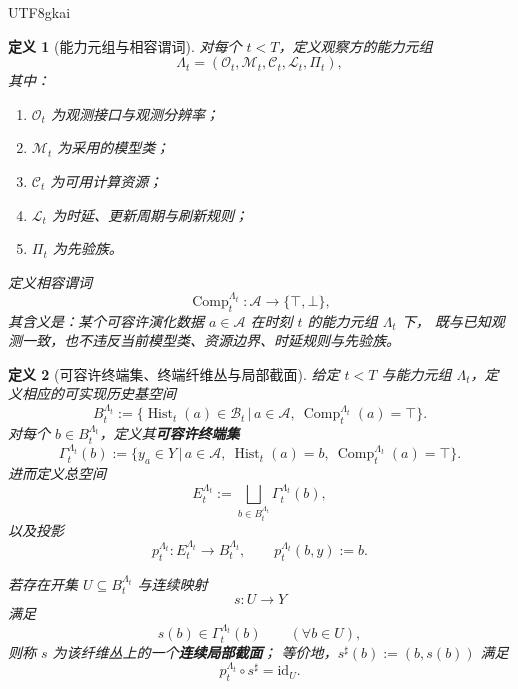 \documentclass[12pt]{article}
\newtheorem{definition}{定义}[section]
\newcommand{\Hist}{\operatorname{Hist}}
\newcommand{\Comp}{\operatorname{Comp}}
\newcommand{\id}{\mathrm{id}}
\begin{document}
\begin{CJK*}{UTF8}{gkai}
\begin{definition}[能力元组与相容谓词]
\label{def:tex1-capability}
对每个 $t<T$，定义观察方的能力元组
\[
  \Lambda_t=(\mathcal O_t,\mathcal M_t,\mathcal C_t,\mathcal L_t,\Pi_t),
\]
其中：
\begin{enumerate}
  \item $\mathcal O_t$ 为观测接口与观测分辨率；
  \item $\mathcal M_t$ 为采用的模型类；
  \item $\mathcal C_t$ 为可用计算资源；
  \item $\mathcal L_t$ 为时延、更新周期与刷新规则；
  \item $\Pi_t$ 为先验族。
\end{enumerate}
定义相容谓词
\[
  \Comp_t^{\Lambda_t}:\mathcal A\to\{\top,\bot\},
\]
其含义是：某个可容许演化数据 $a\in\mathcal A$ 在时刻 $t$ 的能力元组 $\Lambda_t$ 下，
既与已知观测一致，也不违反当前模型类、资源边界、时延规则与先验族。
\end{definition}

\begin{definition}[可容许终端集、终端纤维丛与局部截面]
\label{def:tex1-terminal-fiber}
给定 $t<T$ 与能力元组 $\Lambda_t$，定义相应的可实现历史基空间
\[
  B_t^{\Lambda_t}
  :=
  \bigl\{
    \Hist_t(a)\in \mathcal B_t
    \,\big|\,
    a\in\mathcal A,\ \Comp_t^{\Lambda_t}(a)=\top
  \bigr\}.
\]
对每个 $b\in B_t^{\Lambda_t}$，定义其\textbf{可容许终端集}
\[
  \Gamma_t^{\Lambda_t}(b)
  :=
  \bigl\{
    y_a\in Y
    \,\big|\,
    a\in\mathcal A,\ \Hist_t(a)=b,\ \Comp_t^{\Lambda_t}(a)=\top
  \bigr\}.
\]
进而定义总空间
\[
  E_t^{\Lambda_t}
  :=
  \bigsqcup_{b\in B_t^{\Lambda_t}} \Gamma_t^{\Lambda_t}(b),
\]
以及投影
\[
  p_t^{\Lambda_t}:E_t^{\Lambda_t}\to B_t^{\Lambda_t},
  \qquad
  p_t^{\Lambda_t}(b,y):=b.
\]

若存在开集 $U\subseteq B_t^{\Lambda_t}$ 与连续映射
\[
  s:U\to Y
\]
满足
\[
  s(b)\in\Gamma_t^{\Lambda_t}(b)
  \qquad
  (\forall b\in U),
\]
则称 $s$ 为该纤维丛上的一个\textbf{连续局部截面}；
等价地，$s^\sharp(b):=(b,s(b))$ 满足
\[
  p_t^{\Lambda_t}\circ s^\sharp=\id_U.
\]
\end{definition}


\end{CJK*}
\end{document}
